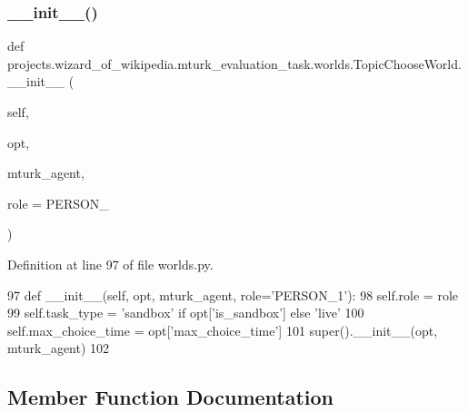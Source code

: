 \subsubsection{\texorpdfstring{\+\_\+\+\_\+init\+\_\+\+\_\+()}{\_\_init\_\_()}}
{\footnotesize\ttfamily def projects.\+wizard\+\_\+of\+\_\+wikipedia.\+mturk\+\_\+evaluation\+\_\+task.\+worlds.\+Topic\+Choose\+World.\+\_\+\+\_\+init\+\_\+\+\_\+ (\begin{DoxyParamCaption}\item[{}]{self,  }\item[{}]{opt,  }\item[{}]{mturk\+\_\+agent,  }\item[{}]{role = {\ttfamily \textquotesingle{}PERSON\+\_\textquotesingle{}} }\end{DoxyParamCaption})}



Definition at line 97 of file worlds.\+py.


\begin{DoxyCode}
97     \textcolor{keyword}{def }\_\_init\_\_(self, opt, mturk\_agent, role='PERSON\_1'):
98         self.role = role
99         self.task\_type = \textcolor{stringliteral}{'sandbox'} \textcolor{keywordflow}{if} opt[\textcolor{stringliteral}{'is\_sandbox'}] \textcolor{keywordflow}{else} \textcolor{stringliteral}{'live'}
100         self.max\_choice\_time = opt[\textcolor{stringliteral}{'max\_choice\_time'}]
101         super().\_\_init\_\_(opt, mturk\_agent)
102 
\end{DoxyCode}


\subsection{Member Function Documentation}
\mbox{\label{classprojects_1_1wizard__of__wikipedia_1_1mturk__evaluation__task_1_1worlds_1_1TopicChooseWorld_a09c14d33c1bc510ad995270b98976123}} 
